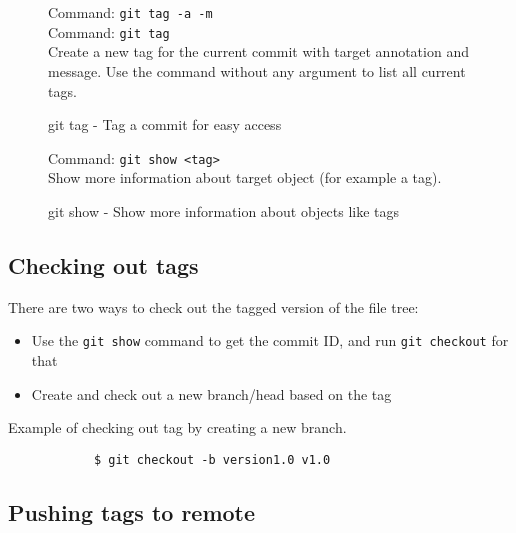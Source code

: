 \documentclass[../main/git_course_main.tex]{subfiles}
\begin{document}
	\begin{figure}[h!]
		\begin{bluebox}
			Command: \verb$git tag -a -m$ \\
			Command: \verb$git tag$ \\
			
			Create a new tag for the current commit with target annotation and message.
			Use the command without any argument to list all current tags.
		\end{bluebox}
		\label{command:tag}
		\caption{git tag - Tag a commit for easy access}
	\end{figure}
	
	\begin{figure}[h!]
		\begin{bluebox}
			Command: \verb$git show <tag>$ \\
			
			Show more information about target object (for example a tag).
		\end{bluebox}
		\label{command:tag}
		\caption{git show - Show more information about objects like tags}
	\end{figure}
	
	\subsection{Checking out tags}
	
	There are two ways to check out the tagged version of the file tree:
	
	\begin{itemize}
		\item Use the \verb$git show$ command to get the commit ID, and run \verb$git checkout$ for that
		\item Create and check out a new branch/head based on the tag
	\end{itemize}
	
	Example of checking out tag by creating a new branch.
	
	\begin{codebox}
		\begin{lstlisting}
			$ git checkout -b version1.0 v1.0
		\end{lstlisting}
	\end{codebox}
	
	\subsection{Pushing tags to remote}
	
\end{document}
